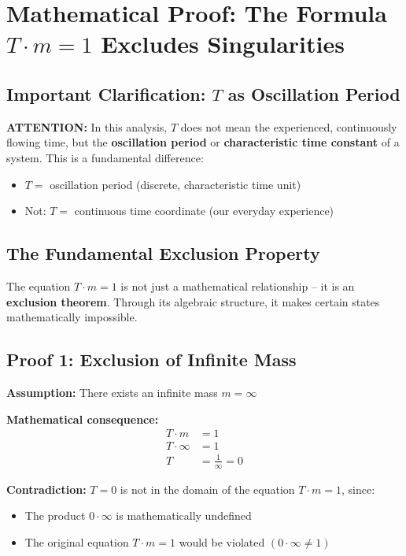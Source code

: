 \documentclass[12pt,a4paper]{article}
\theoremstyle{definition}
\theoremstyle{remark}
\begin{document}
	\section{Mathematical Proof: The Formula $T \cdot m = 1$ Excludes Singularities}
	
	\subsection{Important Clarification: $T$ as Oscillation Period}
	
	\textbf{ATTENTION:} In this analysis, $T$ does not mean the experienced, continuously flowing time, but the \textbf{oscillation period} or \textbf{characteristic time constant} of a system. This is a fundamental difference:
	
	\begin{itemize}
		\item $T =$ oscillation period (discrete, characteristic time unit)
		\item Not: $T =$ continuous time coordinate (our everyday experience)
	\end{itemize}
	
	\subsection{The Fundamental Exclusion Property}
	
	The equation $T \cdot m = 1$ is not just a mathematical relationship -- it is an \textbf{exclusion theorem}. Through its algebraic structure, it makes certain states mathematically impossible.
	
	\subsection{Proof 1: Exclusion of Infinite Mass}
	
	\textbf{Assumption:} There exists an infinite mass $m = \infty$
	
	\textbf{Mathematical consequence:}
	\begin{align}
		T \cdot m &= 1\\
		T \cdot \infty &= 1\\
		T &= \frac{1}{\infty} = 0
	\end{align}
	
	\textbf{Contradiction:} $T = 0$ is not in the domain of the equation $T \cdot m = 1$, since:
	\begin{itemize}
		\item The product $0 \cdot \infty$ is mathematically undefined
		\item The original equation $T \cdot m = 1$ would be violated $(0 \cdot \infty \neq 1)$
	\end{itemize}
	
\end{document}
